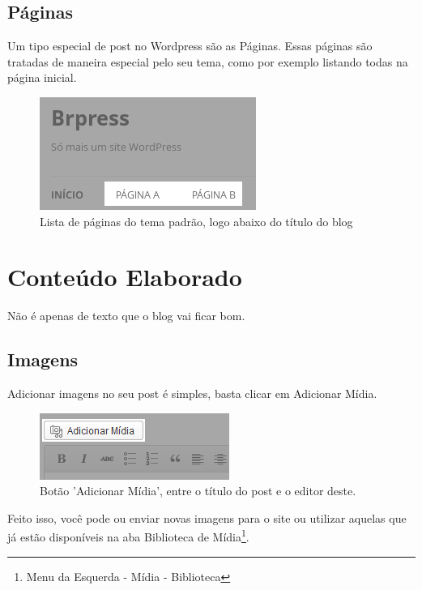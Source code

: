 \documentclass[12pt,onecolumn]{article}
\begin{document}
	\subsection{Páginas}
		Um tipo especial de post no Wordpress são as Páginas.
		Essas páginas são tratadas de maneira especial pelo seu tema, como por
		exemplo listando todas na página inicial.
		\begin{figure}[H]
			\centering
			\includegraphics{page1.png}
			\caption{Lista de páginas do tema padrão, logo abaixo do título do blog}
		\end{figure}
		
\clearpage
\section{Conteúdo Elaborado}
	Não é apenas de texto que o blog vai ficar bom.
	\subsection{Imagens}
		Adicionar imagens no seu post é simples, basta clicar em Adicionar Mídia.
		\begin{figure}[H]
			\centering
			\includegraphics{midia1.png}
			\caption{Botão 'Adicionar Mídia', entre o título do post e o editor deste.}
		\end{figure}
		Feito isso, você pode ou enviar novas imagens para o site ou utilizar 
		aquelas que já estão disponíveis na aba Biblioteca de Mídia\footnote{Menu da Esquerda - Mídia - Biblioteca}.
\end{document}
